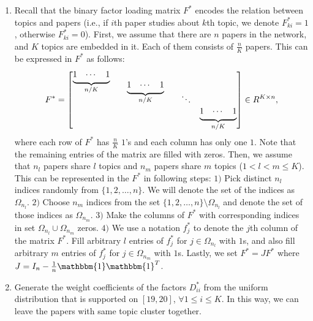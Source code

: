 \documentclass[AMS,STIX1COL]{WileyNJD-v2}
\newcommand{\block}[1]{
  \underbrace{\begin{matrix}1 & \cdots & 1\end{matrix}}_{#1}
}
\begin{document}
{\begin{enumerate}
    \item Recall that the binary factor loading matrix $F^*$ encodes the relation between topics and papers
        (i.e., if $i$th paper studies about $k$th topic, we denote $F^*_{ki}=1$, otherwise $F^*_{ki}=0$).
        First, we assume that there are $n$ papers in the network, and $K$ topics are embedded in it.
        Each of them consists of $\frac{n}{K}$ papers.
        This can be expressed in $F^*$ as follows:
        \[
            F^* =
               \begin{bmatrix}
                 \smash[b]{\block{n/K}} \\
                 && \smash[b]{\block{n/K}} \\
                 &&&& \ddots \\
                 &&&&& \block{n/K}
                \end{bmatrix}
              \in R^{K \times n},
        \]
        where each row of $F^*$ has $\frac{n}{K}$ $1$'s and each column has only one $1$.
        Note that the remaining entries of the matrix are filled with zeros.
        Then, we assume that $n_{l}$ papers share $l$ topics and $n_{m}$ papers share $m$ topics ($1 < l < m \leq K$).
        This can be represented in the $F^*$ in following steps:
        $1)$ Pick distinct $n_{l}$ indices randomly from $\{1,2,\dots,n\}$.
        We will denote the set of the indices as $\Omega_{n_l}$.
        $2)$ Choose $n_{m}$ indices from the set $\{1,2,\dots,n\}\setminus \Omega_{n_{l}}$ and denote the set of those indices as $\Omega_{n_{m}}$.
        $3)$ Make the columns of $F^*$ with corresponding indices in set $\Omega_{n_{l}} \cup \Omega_{n_{m}}$ zeros.
        $4)$ We use a notation $f^*_j$ to denote the $j$th column of the matrix $F^*$.
        Fill arbitrary $l$ entries of $f^*_j$ for $j \in \Omega_{n_l}$ with $1$s, and also fill arbitrary $m$ entries of $f^*_j$ for $j \in \Omega_{n_m}$ with $1$s.
        Lastly, we set $F^*=JF^*$ where $J=I_{n}-\frac{1}{n}\mathbbm{1}\mathbbm{1}^T$.

    \item Generate the weight coefficients of the factors $D^*_{ii}$ from the uniform distribution that is supported on $[19,20]$, $ \forall 1 \leq i \leq K$.
        In this way, we can leave the papers with same topic cluster together.


\end{enumerate}}
\end{document}
